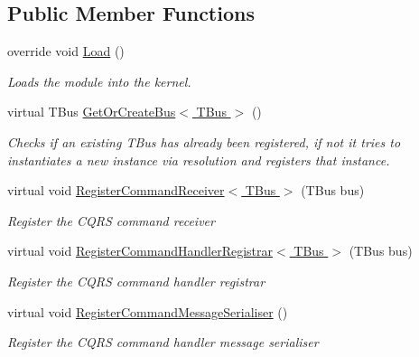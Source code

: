 \subsection*{Public Member Functions}
\begin{DoxyCompactItemize}
\item 
override void \hyperlink{classCqrs_1_1Ninject_1_1Azure_1_1ServiceBus_1_1CommandBus_1_1Configuration_1_1AzureCommandBusReceiverModule_a61b7d4b1fbabc6b1e4d8943f55116a51_a61b7d4b1fbabc6b1e4d8943f55116a51}{Load} ()
\begin{DoxyCompactList}\small\item\em Loads the module into the kernel. \end{DoxyCompactList}\item 
virtual T\+Bus \hyperlink{classCqrs_1_1Ninject_1_1Azure_1_1ServiceBus_1_1CommandBus_1_1Configuration_1_1AzureCommandBusReceiverModule_a02ed26e1f091dc077449dbd3c76305f7_a02ed26e1f091dc077449dbd3c76305f7}{Get\+Or\+Create\+Bus$<$ T\+Bus $>$} ()
\begin{DoxyCompactList}\small\item\em Checks if an existing {\itshape T\+Bus}  has already been registered, if not it tries to instantiates a new instance via resolution and registers that instance. \end{DoxyCompactList}\item 
virtual void \hyperlink{classCqrs_1_1Ninject_1_1Azure_1_1ServiceBus_1_1CommandBus_1_1Configuration_1_1AzureCommandBusReceiverModule_ad8a7eb743b41cb901444922a3d458695_ad8a7eb743b41cb901444922a3d458695}{Register\+Command\+Receiver$<$ T\+Bus $>$} (T\+Bus bus)
\begin{DoxyCompactList}\small\item\em Register the C\+Q\+RS command receiver \end{DoxyCompactList}\item 
virtual void \hyperlink{classCqrs_1_1Ninject_1_1Azure_1_1ServiceBus_1_1CommandBus_1_1Configuration_1_1AzureCommandBusReceiverModule_a66eb0005a2639fbf33d9a9ade7ed2c8e_a66eb0005a2639fbf33d9a9ade7ed2c8e}{Register\+Command\+Handler\+Registrar$<$ T\+Bus $>$} (T\+Bus bus)
\begin{DoxyCompactList}\small\item\em Register the C\+Q\+RS command handler registrar \end{DoxyCompactList}\item 
virtual void \hyperlink{classCqrs_1_1Ninject_1_1Azure_1_1ServiceBus_1_1CommandBus_1_1Configuration_1_1AzureCommandBusReceiverModule_a4a068e214a9adee012fa16365d8d2fe7_a4a068e214a9adee012fa16365d8d2fe7}{Register\+Command\+Message\+Serialiser} ()
\begin{DoxyCompactList}\small\item\em Register the C\+Q\+RS command handler message serialiser \end{DoxyCompactList}\end{DoxyCompactItemize}


